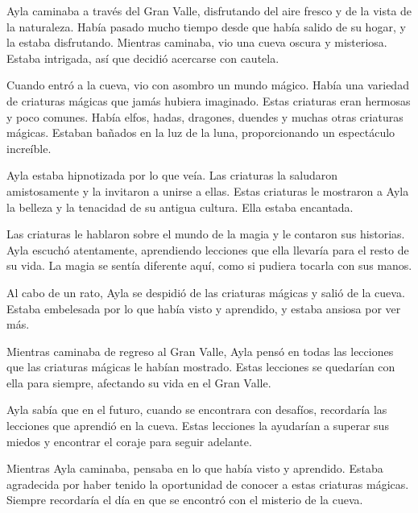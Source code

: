 

Ayla caminaba a través del Gran Valle, disfrutando del aire fresco y de la vista de la naturaleza. Había pasado mucho tiempo desde que había salido de su hogar, y la estaba disfrutando. Mientras caminaba, vio una cueva oscura y misteriosa. Estaba intrigada, así que decidió acercarse con cautela.

Cuando entró a la cueva, vio con asombro un mundo mágico. Había una variedad de criaturas mágicas que jamás hubiera imaginado. Estas criaturas eran hermosas y poco comunes. Había elfos, hadas, dragones, duendes y muchas otras criaturas mágicas. Estaban bañados en la luz de la luna, proporcionando un espectáculo increíble.

Ayla estaba hipnotizada por lo que veía. Las criaturas la saludaron amistosamente y la invitaron a unirse a ellas. Estas criaturas le mostraron a Ayla la belleza y la tenacidad de su antigua cultura. Ella estaba encantada.

Las criaturas le hablaron sobre el mundo de la magia y le contaron sus historias. Ayla escuchó atentamente, aprendiendo lecciones que ella llevaría para el resto de su vida. La magia se sentía diferente aquí, como si pudiera tocarla con sus manos.

Al cabo de un rato, Ayla se despidió de las criaturas mágicas y salió de la cueva. Estaba embelesada por lo que había visto y aprendido, y estaba ansiosa por ver más.

Mientras caminaba de regreso al Gran Valle, Ayla pensó en todas las lecciones que las criaturas mágicas le habían mostrado. Estas lecciones se quedarían con ella para siempre, afectando su vida en el Gran Valle.

Ayla sabía que en el futuro, cuando se encontrara con desafíos, recordaría las lecciones que aprendió en la cueva. Estas lecciones la ayudarían a superar sus miedos y encontrar el coraje para seguir adelante.

Mientras Ayla caminaba, pensaba en lo que había visto y aprendido. Estaba agradecida por haber tenido la oportunidad de conocer a estas criaturas mágicas. Siempre recordaría el día en que se encontró con el misterio de la cueva.